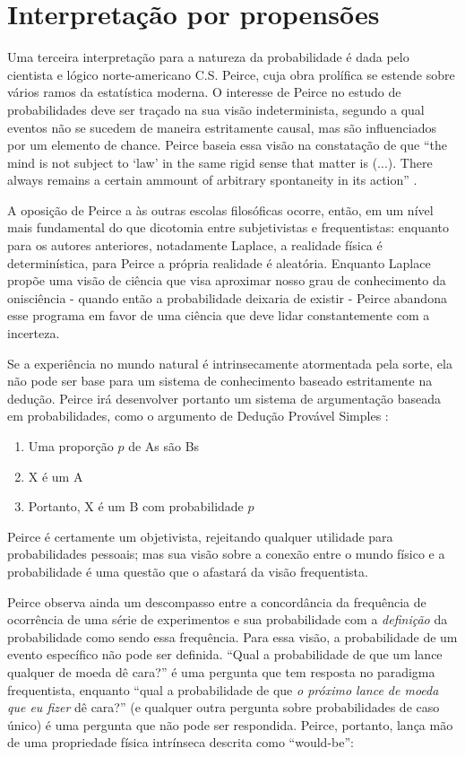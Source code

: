 \section{Interpretação por propensões}

Uma terceira interpretação para a natureza da probabilidade é dada pelo cientista e lógico norte-americano C.S. Peirce,
cuja obra prolífica se estende sobre vários ramos da estatística moderna. 
O interesse de Peirce no estudo de probabilidades
deve ser traçado na sua visão indeterminista, segundo a qual eventos não 
se sucedem de maneira estritamente causal, mas são
influenciados por um elemento de chance. Peirce baseia essa visão 
na constatação de que ``the mind is not subject to `law'
in the same rigid sense that matter is (...). There always remains 
a certain ammount of arbitrary spontaneity in its action''
\citep{Peirce1892}. 

A oposição de Peirce a às outras escolas filosóficas ocorre, então, em um nível mais fundamental do que dicotomia entre
subjetivistas e frequentistas: enquanto para os autores anteriores, notadamente Laplace, a realidade física 
é determinística, para Peirce a própria realidade é aleatória. Enquanto Laplace propõe uma visão de ciência que visa aproximar nosso
grau de conhecimento da onisciência - quando então a probabilidade deixaria de existir - Peirce abandona esse programa em favor
de uma ciência que deve lidar constantemente com a incerteza.

Se a experiência no mundo natural é intrinsecamente atormentada pela sorte, ela não pode ser base para um sistema de
conhecimento baseado estritamente na dedução. Peirce irá desenvolver
portanto um sistema de argumentação baseada em probabilidades, como o argumento de Dedução Provável Simples \citep{Fetzer93}:

\begin{enumerate}
	\item Uma proporção $p$ de As são Bs
	\item X é um A
	\item Portanto, X é um B com probabilidade $p$ 
\end{enumerate}

Peirce é certamente um objetivista, rejeitando qualquer utilidade para probabilidades pessoais; mas sua visão sobre a conexão entre o
mundo físico e a probabilidade é uma questão que o afastará da visão frequentista.
 
Peirce observa ainda um descompasso entre a concordância da frequência de ocorrência
de uma série de experimentos e sua probabilidade com a {\em definição} da probabilidade como sendo essa frequência. Para
essa visão, a probabilidade de um evento específico não pode ser definida. ``Qual a probabilidade de que um lance qualquer
de moeda dê cara?'' é uma pergunta que tem resposta no paradigma frequentista, enquanto ``qual a probabilidade de que 
{\em o próximo lance de moeda que eu fizer} dê cara?'' (e qualquer outra pergunta sobre probabilidades de caso único)
é uma pergunta que não pode ser respondida. Peirce, portanto, lança
mão de uma propriedade física intrínseca descrita como ``would-be'':

